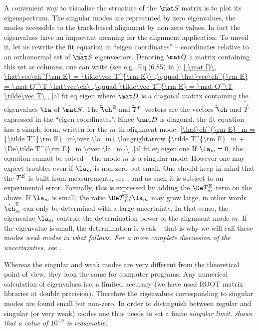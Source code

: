 A convenient way to visualize the structure of the $\tilde\mat S$ matrix is to plot its eigenspectrum. The singular modes are represented by zero eigenvalues, the modes accessible to the track-based alignment by non-zero values. In fact the eigenvalues have an important meaning for the alignment application. To unveil it, let us rewrite the fit equation  in ``eigen coordinates'' -- coordinates relative to an orthonormal set of $\tilde\mat S$ eigenvectors. Denoting $\mat Q$ a matrix containing this set as columns, one can write (see e.g.~Eq.(6.85) in ):
\eqref{
	\mat D\, \hat\vec\ch^{\rm E} = \tilde\vec T^{\rm E}\ ,\qquad
	\hat\vec\ch^{\rm E} = \mat Q^\T \hat\vec\ch\ ,\qquad
	\tilde\vec T^{\rm E} = \mat Q^\T \tilde\vec T\ ,
}{al fit eq eigen}
where $\mat D$ is a diagonal matrix containing the eigenvalues $\la$ of $\tilde\mat S$. The $\hat\vec\ch^{\rm E}$ and $\tilde\vec T^{\rm E}$ vectors are the vectors $\hat\vec\ch$ and $\tilde\vec T$ expressed in the ``eigen coordinates''. Since $\mat D$ is diagonal, the fit equation has a simple form, written for the $m$-th alignment mode:
\eqref{\hat\ch^{\rm E}_m = {\tilde T^{\rm E}_m\over \la_m} \longrightarrow {\tilde T^{\rm E}_m + \De\tilde T^{\rm E}_m \over \la_m}\ .}{al fit eq eigen one}
If $\la_m = 0$, the equation cannot be solved -- the mode $m$ is a singular mode. However one may expect troubles even if $\la_m$ is non-zero but small. One should keep in mind that the $\tilde T^{\rm E}$ is built from measurements, see , and as such it is subject to an experimental error. Formally, this is expressed by adding the $\De\tilde T^{\rm E}_m$ term on the \rhs{} above. If $\la_m$ is small, the ratio $\De\tilde T^{\rm E}_m/\la_m$ may grow large, in other words $\hat\ch^{\rm E}_m$ can only be determined with a large uncertainty. In that sense, the eigenvalue $\la_m$ controls the determination power of the alignment mode $m$. If the eigenvalue is small, the determination is weak -- that is why we will call these modes \em{weak modes} in what follows. For a more complete discussion of the uncertainties, see .

Whereas the singular and weak modes are very different from the theoretical point of view, they look the same for computer programs. Any numerical calculation of eigenvalues has a limited accuracy (we have used ROOT matrix libraries  at double precision). Therefore the eigenvalues corresponding to singular modes are found small but non-zero. In order to distinguish between regular and singular (or very weak) modes one thus needs to set a finite \em{singular limit}.  shows that a value of $10^{-9}$ is reasonable.

